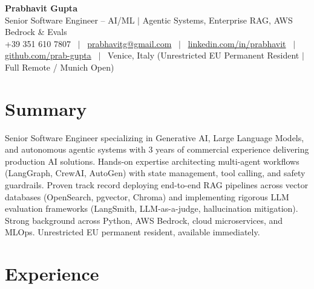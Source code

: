 \documentclass[a4paper,10pt]{article}
\begin{document}
\begin{minipage}[c]{0.80\textwidth}
  {\Huge\bfseries Prabhavit Gupta}\\[3pt]
  {\color{accent}\large Senior Software Engineer -- AI/ML $\vert$ Agentic Systems, Enterprise RAG, AWS Bedrock \& Evals}\\[6pt]
  {\footnotesize +39 351 610 7807 ~$\vert$~
  \href{mailto:prabhavitg@gmail.com}{prabhavitg@gmail.com} ~$\vert$~
  \href{https://www.linkedin.com/in/prabhavit/}{linkedin.com/in/prabhavit} ~$\vert$~
  \href{https://github.com/prab-gupta}{github.com/prab-gupta} ~$\vert$~
  Venice, Italy (Unrestricted EU Permanent Resident $\vert$ Full Remote / Munich Open)}
\end{minipage}\hfill

\section{Summary}
Senior Software Engineer specializing in Generative AI, Large Language Models, and autonomous agentic systems with 3 years of commercial experience delivering production AI solutions. Hands-on expertise architecting multi-agent workflows (LangGraph, CrewAI, AutoGen) with state management, tool calling, and safety guardrails. Proven track record deploying end-to-end RAG pipelines across vector databases (OpenSearch, pgvector, Chroma) and implementing rigorous LLM evaluation frameworks (LangSmith, LLM-as-a-judge, hallucination mitigation). Strong background across Python, AWS Bedrock, cloud microservices, and MLOps. Unrestricted EU permanent resident, available immediately.

\section{Experience}
\end{document}
